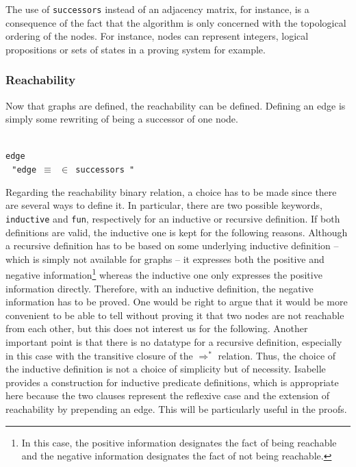 \documentclass[a4 paper, 12pt]{article}
\newcommand{\abbreviation}{{\color{isa_blue}{abbreviation}}}
\newcommand{\where}{{\color{isa_green}{where}}}
\newcommand{\isa}[1]{\small\texttt{\\\noindent#1}}
\newcommand{\green}[1]{{\color{isa_dark_green}{#1}}}
\theoremstyle{definition}
\begin{document}
\BlankLine
\BlankLine
\BlankLine

The use of \texttt{successors} instead of an adjacency matrix, for instance, is a consequence of the fact that the algorithm is only concerned with the topological ordering of the nodes. For instance, nodes can represent integers, logical propositions or sets of states in a proving system for example.

\subsubsection{Reachability}
Now that graphs are defined, the reachability can be defined. Defining an edge is simply some rewriting of being a successor of one node.

\isa{
    \abbreviation{} edge \where\\
    $~~~$"edge \green{x y} $\equiv$ \green{y} $\in$ successors \green{x}"
}

\BlankLine
\BlankLine
\BlankLine

\noindent
Regarding the reachability binary relation, a choice has to be made since there are several ways to define it. In particular, there are two possible keywords, {\color{isa_blue}\texttt{inductive}} and {\color{isa_blue}\texttt{fun}}, respectively for an inductive or recursive definition. If both definitions are valid, the inductive one is kept for the following reasons. Although a recursive definition has to be based on some underlying inductive definition -- which is simply not available for graphs -- it expresses both the positive and negative information\footnote{In this case, the positive information designates the fact of being reachable and the negative information designates the fact of not being reachable.} whereas the inductive one only expresses the positive information directly. Therefore, with an inductive definition, the negative information has to be proved. One would be right to argue that it would be more convenient to be able to tell without proving it that two nodes are not reachable from each other, but this does not interest us for the following. Another important point is that there is no datatype for a recursive definition, especially in this case with the transitive closure of the $\Rightarrow^*$ relation. Thus, the choice of the inductive definition is not a choice of simplicity but of necessity. Isabelle provides a construction for inductive predicate definitions, which is appropriate here because the two clauses represent the reflexive case and the extension of reachability by prepending an edge. This will be particularly useful in the proofs.
\end{document}

